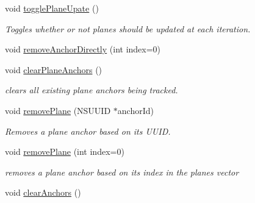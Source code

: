 \begin{DoxyCompactItemize}
void \hyperlink{class_a_r_core_1_1_a_r_anchor_manager_a78da6cdbe64e12e49dc67adef5ac085b}{toggle\+Plane\+Upate} ()
\begin{DoxyCompactList}\small\item\em Toggles whether or not planes should be updated at each iteration. \end{DoxyCompactList}\item 
void \hyperlink{class_a_r_core_1_1_a_r_anchor_manager_aeaa578780e37129fb899b3f5a762af63}{remove\+Anchor\+Directly} (int index=0)
\item 
\mbox{\label{class_a_r_core_1_1_a_r_anchor_manager_aec308e2f34682a568b2bda022a21a3ed}} 
void \hyperlink{class_a_r_core_1_1_a_r_anchor_manager_aec308e2f34682a568b2bda022a21a3ed}{clear\+Plane\+Anchors} ()
\begin{DoxyCompactList}\small\item\em clears all existing plane anchors being tracked. \end{DoxyCompactList}\item 
\mbox{\label{class_a_r_core_1_1_a_r_anchor_manager_a65690e39286b733631eb52c8e740bc79}} 
void \hyperlink{class_a_r_core_1_1_a_r_anchor_manager_a65690e39286b733631eb52c8e740bc79}{remove\+Plane} (N\+S\+U\+U\+ID $\ast$anchor\+Id)
\begin{DoxyCompactList}\small\item\em Removes a plane anchor based on it\textquotesingle{}s U\+U\+ID. \end{DoxyCompactList}\item 
\mbox{\label{class_a_r_core_1_1_a_r_anchor_manager_a7d01736351089d31708ca4c577da99a4}} 
void \hyperlink{class_a_r_core_1_1_a_r_anchor_manager_a7d01736351089d31708ca4c577da99a4}{remove\+Plane} (int index=0)
\begin{DoxyCompactList}\small\item\em removes a plane anchor based on it\textquotesingle{}s index in the planes vector \end{DoxyCompactList}\item 
\mbox{\label{class_a_r_core_1_1_a_r_anchor_manager_af78ff242457a15c5073b8a2557a96974}} 
void \hyperlink{class_a_r_core_1_1_a_r_anchor_manager_af78ff242457a15c5073b8a2557a96974}{clear\+Anchors} ()

\end{DoxyCompactItemize}
